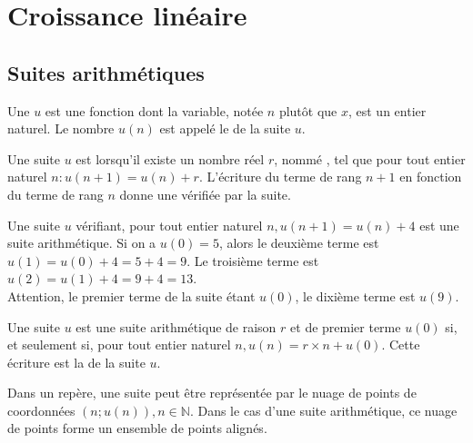 \chapter{Croissance linéaire}
\thispagestyle{fancy}

\section{Suites arithmétiques}

\begin{definition}
	Une  $u$ est une fonction dont la variable, notée $n$ plutôt que $x$, est un entier naturel. Le nombre $u(n)$ est appelé le  de la suite $u$.
\end{definition}

\begin{definitions}
	Une suite $u$ est  lorsqu'il existe un nombre réel $r$, nommé , tel que pour tout entier naturel $n: u(n+1)=u(n)+r$. L'écriture du terme de rang $n+1$ en fonction du terme de rang $n$ donne une  vérifiée par la suite.
\end{definitions}

\begin{exemple}
Une suite $u$ vérifiant, pour tout entier naturel $n, u(n+1)=u(n)+4$ est une suite arithmétique. Si on a $u(0)=5$, alors le deuxième terme est $u(1)=u(0)+4=5+4=9$. Le troisième terme est $u(2)=u(1)+4=9+4=13$.\\
Attention, le premier terme de la suite étant $u(0)$, le dixième terme est $u(9)$.
\end{exemple}

\begin{propriete}
	Une suite $u$ est une suite arithmétique de raison $r$ et de premier terme $u(0)$ si, et seulement si, pour tout entier naturel $n, u(n)=r \times n+u(0)$. Cette écriture est la  de la suite $u$.
\end{propriete}

\begin{propriete}
	Dans un repère, une suite peut être représentée par le nuage de points de coordonnées $(n ; u(n)), n \in \mathbb{N}$. Dans le cas d'une suite arithmétique, ce nuage de points forme un ensemble de points alignés.
\end{propriete}

